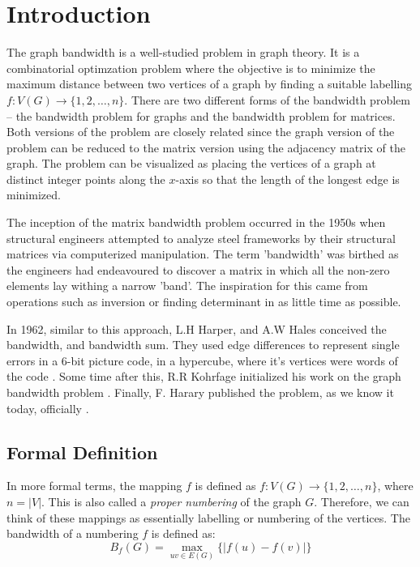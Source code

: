 \documentclass[conference,compsoc]{IEEEtran}
\begin{document}
\section{Introduction} 
The graph bandwidth is a well-studied problem in graph theory. It is a combinatorial optimzation problem where the objective 
is to minimize the maximum distance between two vertices of a graph by finding a suitable labelling $f: V(G) \to \{1, 2, \dots, n\}$.
There are two different forms of the bandwidth problem -- the bandwidth problem for graphs and the bandwidth problem for matrices. 
Both versions of the problem are closely related since the graph version of the problem can be reduced to the matrix version using 
the adjacency matrix of the graph. 
The problem can be visualized as placing the vertices of a graph at distinct integer points along the $x$-axis so that the 
length of the longest edge is minimized. 

The inception of the matrix bandwidth problem occurred in the 1950s when structural engineers 
attempted to analyze steel frameworks by their structural matrices via computerized manipulation. The term 'bandwidth' 
was birthed as the engineers had endeavoured to discover a matrix in which all the non-zero elements 
lay withing a narrow 'band'. The inspiration for this came from operations such as 
inversion or finding determinant in as little time as possible.

In 1962, similar to this approach, L.H Harper, and A.W Hales conceived the bandwidth, 
and bandwidth sum. They used edge differences to represent single errors in a 6-bit picture code, 
in a hypercube, where it's vertices were words of the code \cite{10.2307/2946514}. Some time after this, 
R.R Kohrfage initialized his work on the graph bandwidth problem \cite{ccdg1982}. Finally, F. Harary 
published the problem, as we know it today, officially \cite{https://doi.org/10.1002/bimj.19660080427}.

\subsection{Formal Definition} \label{intro}
In more formal terms, 
the mapping $f$ is defined as $f: V(G) \to \{1, 2, \dots, n\}$, where $n = |V|$. This is also called 
a \emph{proper numbering} of the graph $G$.\cite{Lee2016} Therefore, 
we can think of these mappings as essentially labelling or numbering of the vertices. The bandwidth of a numbering $f$
is defined as:
\begin{equation}
B_f(G) = \max_{uv \in E(G)}\{|f(u) - f(v)|\}
\end{equation}
\end{document}

